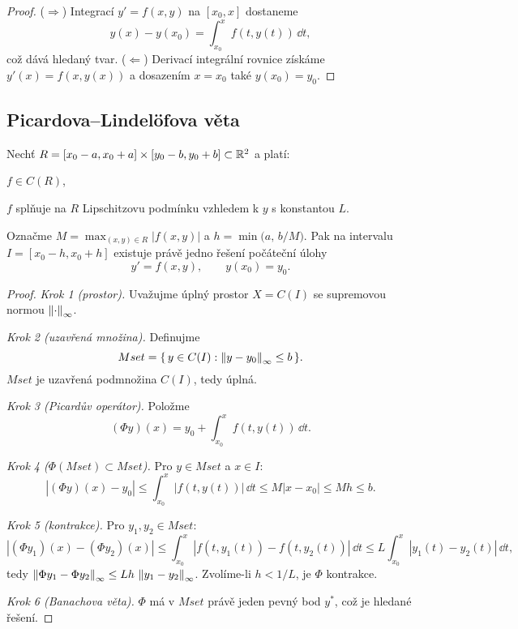 \begin{proof}
($\Rightarrow$) Integrací $y'=f(x,y)$ na $[x_0,x]$ dostaneme
\[
y(x)-y(x_0)=\int_{x_0}^{x} f(t,y(t))\,\dd t,
\]
což dává hledaný tvar. 
($\Leftarrow$) Derivací integrální rovnice získáme $y'(x)=f(x,y(x))$ a dosazením $x=x_0$ také $y(x_0)=y_0$.
\end{proof}

\spc

\subsection{Picardova–Lindelöfova věta}
\label{sec:picard-lindelof}

\begin{theorem}
\label{vet:picard-lindelof}
Nechť $R=[x_0-a,x_0+a]\times[y_0-b,y_0+b]\subset\mathbb{R}^2$ a platí:
\begin{romanenum}
\item $f\in C(R)$,
\item $f$ splňuje na $R$ Lipschitzovu podmínku vzhledem k $y$ s konstantou $L$.
\end{romanenum}
Označme $M=\max_{(x,y)\in R}|f(x,y)|$ a $h=\min\!\big(a,\, b/M\big)$. Pak na intervalu $I=[x_0-h,x_0+h]$ existuje právě jedno řešení počáteční úlohy
\[
y'=f(x,y),\qquad y(x_0)=y_0.
\]
\end{theorem}

\begin{proof}
\textit{Krok 1 (prostor).} Uvažujme úplný prostor $X=C(I)$ se supremovou normou $\left\lVert \cdot \right\rVert_\infty$.

\textit{Krok 2 (uzavřená množina).} Definujme
\[
Mset=\{\,y\in C(I): \left\lVert y-y_0 \right\rVert_\infty\le b\,\}.
\]
$Mset$ je uzavřená podmnožina $C(I)$, tedy úplná.

\textit{Krok 3 (Picardův operátor).} Položme
\[
(\Phi y)(x)=y_0+\int_{x_0}^{x} f(t,y(t))\,\dd t .
\]

\textit{Krok 4 ($\Phi(Mset)\subset Mset$).} Pro $y\in Mset$ a $x\in I$:
\[
|(\Phi y)(x)-y_0| \le \int_{x_0}^{x} |f(t,y(t))|\,\dd t \le M|x-x_0|\le Mh\le b.
\]

\textit{Krok 5 (kontrakce).} Pro $y_1,y_2\in Mset$:
\[
|(\Phi y_1)(x)-(\Phi y_2)(x)| \le \int_{x_0}^{x} |f(t,y_1(t))-f(t,y_2(t))|\,\dd t 
\le L \int_{x_0}^{x} |y_1(t)-y_2(t)|\,\dd t,
\]
tedy $\left\lVert \Phi y_1-\Phi y_2 \right\rVert_\infty \le Lh\,\left\lVert y_1-y_2 \right\rVert_\infty$. 
Zvolíme-li $h<1/L$, je $\Phi$ kontrakce.

\textit{Krok 6 (Banachova věta).} $\Phi$ má v $Mset$ právě jeden pevný bod $y^\ast$, což je hledané řešení.
\end{proof}

